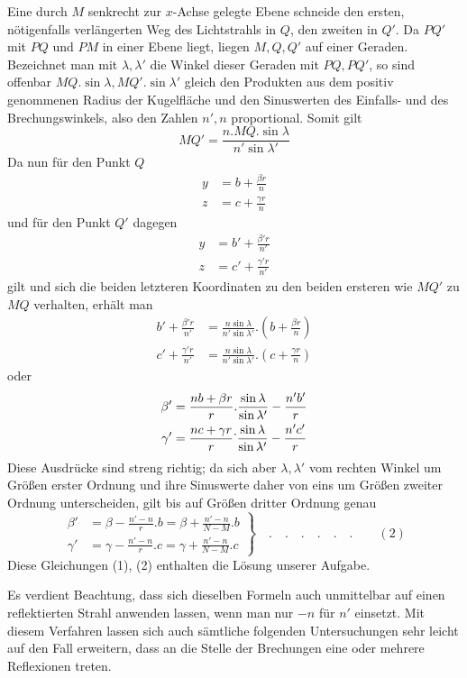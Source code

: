 Eine durch $M$ senkrecht zur $x$-Achse gelegte Ebene schneide den ersten, nötigenfalls verlängerten Weg des Lichtstrahls in $Q$, den zweiten in $Q'$. Da $PQ'$ mit $PQ$ und $PM$ in einer Ebene liegt, liegen $M,Q,Q'$ auf einer Geraden. Bezeichnet man mit $\lambda,\lambda'$ die Winkel dieser Geraden mit $PQ,PQ'$, so sind offenbar
$MQ.\sin\lambda,MQ'.\sin\lambda'$ gleich den Produkten aus dem positiv genommenen Radius der Kugelfläche und den Sinuswerten des Einfalls- und des Brechungswinkels, also den Zahlen $n',n$ proportional. Somit gilt
\[
MQ'=\frac{n.MQ.\sin\lambda}{n'\sin\lambda'}
\]
Da nun für den Punkt $Q$
\[
\begin{aligned}
y&=b+\frac{\beta r}n\\
z&=c+\frac{\gamma r}n
\end{aligned}
\]
und für den Punkt $Q'$ dagegen
\[
\begin{aligned}
y&=b'+\frac{\beta'r}{n'}\\
z&=c'+\frac{\gamma'r}{n'}
\end{aligned}
\]
gilt und sich die beiden letzteren Koordinaten zu den beiden ersteren wie $MQ'$ zu $MQ$ verhalten, erhält man
\[
\begin{aligned}
b'+\frac{\beta'r}{n'}&=\frac{n\sin\lambda}{n'\sin\lambda'}.\left(b+\frac{\beta r}n\right)\\
c'+\frac{\gamma'r}{n'}&=\frac{n\sin\lambda}{n'\sin\lambda'}.\left(c+\frac{\gamma r}n\right)
\end{aligned}
\]
oder
\[
\begin{aligned}
\beta'&=\frac{nb+\beta r}{r}.\frac{\sin\lambda}{\sin\lambda'}-\frac{n'b'}r\\
\gamma'&=\frac{nc+\gamma r}{r}\raisebox{0.55em}{.}\frac{\sin\lambda}{\sin\lambda'}-\frac{n'c'}r
\end{aligned}
\]
Diese Ausdrücke sind streng richtig; da sich aber $\lambda,\lambda'$ vom rechten Winkel um Größen erster Ordnung und ihre Sinuswerte daher von eins um Größen zweiter Ordnung unterscheiden, gilt bis auf Größen dritter Ordnung genau
\[
\left.\begin{aligned}
\beta'&=\beta-\frac{n'-n}r.b=\beta+\frac{n'-n}{N-M}.b\\
\gamma'&=\gamma-\frac{n'-n}r.c=\gamma+\frac{n'-n}{N-M}.c
\end{aligned}\right\}\quad .\quad .\quad .\quad .\quad .\quad .\qquad(2)
\]
Diese Gleichungen (1), (2) enthalten die Lösung unserer Aufgabe.

Es verdient Beachtung, dass sich dieselben Formeln auch unmittelbar auf einen reflektierten Strahl anwenden lassen, wenn man nur $-n$ für $n'$ einsetzt. Mit diesem Verfahren lassen sich auch sämtliche folgenden Untersuchungen sehr leicht auf den Fall erweitern, dass an die Stelle der Brechungen eine oder mehrere Reflexionen treten.

